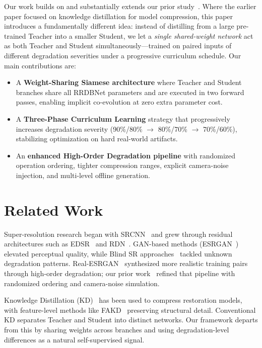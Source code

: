 \documentclass[runningheads]{llncs}
\begin{document}
Our work builds on and substantially extends our prior study~\cite{11309534}. Where the earlier paper focused on knowledge distillation for model compression, this paper introduces a fundamentally different idea: instead of distilling from a large pre-trained Teacher into a smaller Student, we let a \emph{single shared-weight network} act as both Teacher and Student simultaneously—trained on paired inputs of different degradation severities under a progressive curriculum schedule. Our main contributions are:
\begin{itemize}
    \item A \textbf{Weight-Sharing Siamese architecture} where Teacher and Student branches share all RRDBNet parameters and are executed in two forward passes, enabling implicit co-evolution at zero extra parameter cost.
    \item A \textbf{Three-Phase Curriculum Learning} strategy that progressively increases degradation severity (90\%/80\% $\to$ 80\%/70\% $\to$ 70\%/60\%), stabilizing optimization on hard real-world artifacts.
    \item An \textbf{enhanced High-Order Degradation pipeline} with randomized operation ordering, tighter compression ranges, explicit camera-noise injection, and multi-level offline generation.
\end{itemize}

\section{Related Work}

Super-resolution research began with SRCNN~\cite{dong2014learning} and grew through residual architectures such as EDSR~\cite{lim2017enhanced} and RDN~\cite{zhang2018residual}. GAN-based methods (ESRGAN~\cite{wang2018esrgan}) elevated perceptual quality, while Blind SR approaches~\cite{zhang2018learning,luo2020unfolding,gu2019blind} tackled unknown degradation patterns. Real-ESRGAN~\cite{wang2021realesrgan} synthesized more realistic training pairs through high-order degradation; our prior work~\cite{11309534} refined that pipeline with randomized ordering and camera-noise simulation.

Knowledge Distillation (KD)~\cite{hinton2015distilling,Hui_2019} has been used to compress restoration models, with feature-level methods like FAKD~\cite{gao2022featuredistillationinteractionweighting} preserving structural detail. Conventional KD separates Teacher and Student into distinct networks. Our framework departs from this by sharing weights across branches and using degradation-level differences as a natural self-supervised signal.
\end{document}
